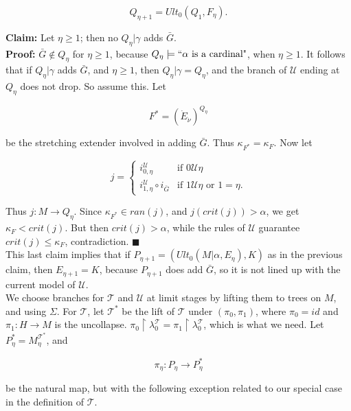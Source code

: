 \documentclass[12pt]{article}
\begin{document}
\[
Q_{\eta + 1} = Ult_0 (Q_1, F_\eta ).
\]

\textbf{Claim:} Let $\eta \geq 1$; then no $Q_\eta | \gamma$ adds $\bar{G}$.\\

\textbf{Proof:} $\bar{G} \notin Q_\eta$ for $\eta \geq 1$, because $Q_\eta \models `` \alpha \text{ is a cardinal"}$, when $\eta \geq 1$.  It follows that if $Q_\eta | \gamma$ adds $\bar{G}$, and $\eta \geq 1$, then $Q_\eta | \gamma = Q_\eta$, and the branch of $\mathscr{U}$ ending at $Q_\eta$ does not drop.  So assume this.  Let

\[
F^* = ( \dot{E}_{\dot{\nu}})^{Q_\eta}
\]

be the stretching extender involved in adding $\bar{G}$.  Thus $\kappa_{F^*} = \kappa_F$.  Now let

\[
j =
\begin{cases}
i_{0, \eta}^{\mathscr{U}} & \text{if } 0 \mathscr{U} \eta\\

i_{1, \eta}^{\mathscr{U}} \circ i_{\bar{G}} & \text{if } 1 \mathscr{U} \eta \text{ or } 1 = \eta .
\end{cases}
\]

Thus $j: M \longrightarrow Q_\eta$.  Since $\kappa_{F^*} \in ran(j)$, and $j (crit(j)) > \alpha$, we get $\kappa_F < crit(j)$.  But then $crit(j) > \alpha$, while the rules of $\mathscr{U}$ guarantee $crit(j) \leq \kappa_F$, contradiction. $\blacksquare$\\

This last claim implies that if $P_{\eta + 1} = (Ult_0 (M | \alpha , E_\eta) , K)$ as in the previous claim, then $E_{\eta + 1} = K$, because $P_{\eta + 1}$ does add $\bar{G}$, so it is not lined up with the current model of $\mathscr{U}$.\\

We choose branches for $\mathscr{T}$ and $\mathscr{U}$ at limit stages by lifting them to trees on $M$, and using $\Sigma$.  For $\mathscr{T}$, let $\mathscr{T}^*$ be the lift of $\mathscr{T}$ under $(\pi_0 , \pi_1 )$, where $\pi_0 = id$ and $\pi_1 : H \longrightarrow M$ is the uncollapse.  $\pi_0 \restriction \lambda_0^{\mathscr{T}} = \pi_1 \restriction \lambda_0^{\mathscr{T}}$, which is what we need.  Let $P_\eta^* = M_\eta^{\mathscr{T}^*}$, and

\[
\pi_\eta: P_\eta \longrightarrow P_\eta^*
\]

be the natural map, but with the following exception related to our special case in the definition of $\mathscr{T}$.
\end{document}
